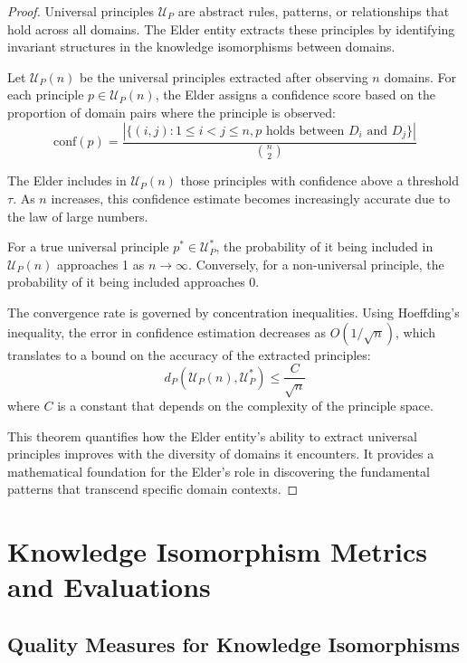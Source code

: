 \begin{proof}
Universal principles $\mathcal{U}_P$ are abstract rules, patterns, or relationships that hold across all domains. The Elder entity extracts these principles by identifying invariant structures in the knowledge isomorphisms between domains.

Let $\mathcal{U}_P(n)$ be the universal principles extracted after observing $n$ domains. For each principle $p \in \mathcal{U}_P(n)$, the Elder assigns a confidence score based on the proportion of domain pairs where the principle is observed:
\begin{equation}
\text{conf}(p) = \frac{|\{(i,j) : 1 \leq i < j \leq n, p \text{ holds between } D_i \text{ and } D_j\}|}{\binom{n}{2}}
\end{equation}

The Elder includes in $\mathcal{U}_P(n)$ those principles with confidence above a threshold $\tau$. As $n$ increases, this confidence estimate becomes increasingly accurate due to the law of large numbers.

For a true universal principle $p^* \in \mathcal{U}_P^*$, the probability of it being included in $\mathcal{U}_P(n)$ approaches 1 as $n \to \infty$. Conversely, for a non-universal principle, the probability of it being included approaches 0.

The convergence rate is governed by concentration inequalities. Using Hoeffding's inequality, the error in confidence estimation decreases as $O(1/\sqrt{n})$, which translates to a bound on the accuracy of the extracted principles:
\begin{equation}
d_P(\mathcal{U}_P(n), \mathcal{U}_P^*) \leq \frac{C}{\sqrt{n}}
\end{equation}
where $C$ is a constant that depends on the complexity of the principle space.

This theorem quantifies how the Elder entity's ability to extract universal principles improves with the diversity of domains it encounters. It provides a mathematical foundation for the Elder's role in discovering the fundamental patterns that transcend specific domain contexts.
\end{proof}

\section{Knowledge Isomorphism Metrics and Evaluations}

\subsection{Quality Measures for Knowledge Isomorphisms}

